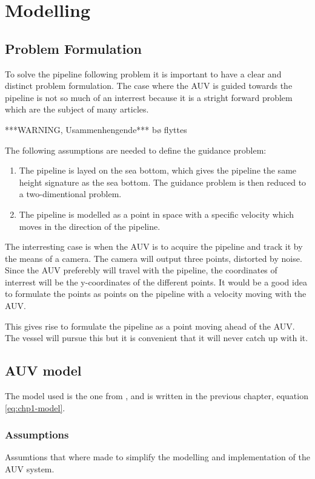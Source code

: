\chapter{Modelling}

\section{Problem Formulation}
\label{chap2:problem}
	To solve the pipeline following problem it is important to have a clear and distinct problem formulation. 
	The case where the AUV is guided towards the pipeline is not so much of an interrest because it is a stright 
	forward problem which are the subject of many articles. 


	***WARNING, Usammenhengende*** bø flyttes

	The following assumptions are needed to define the guidance problem:
		\begin{enumerate}
			\item The pipeline is layed on the sea bottom, which gives the pipeline the same
			height signature as the sea bottom. The guidance problem is then reduced to a
			two-dimentional problem.
			\item The pipeline is modelled as a point in space with a specific velocity which
			moves in the direction of the pipeline.
		\end{enumerate}

	The interresting case is when the AUV is to acquire the pipeline and track it by the means of a camera. The
	camera will output three points, distorted by noise. Since the AUV preferebly will travel with the
	pipeline, the coordinates of interrest will be the y-coordinates of the different points. It would be
	a good idea to formulate the points as points on the pipeline with a velocity moving with the AUV.

	This gives rise to formulate the pipeline as a point moving ahead of the AUV. The vessel will pursue
	this but it is convenient that it will never catch up with it.


\section{AUV model}
	The model used is the one from \cite{fossen}, and is written in the previous chapter, equation \eqref{eq:chp1-model}.
	
	\subsection{Assumptions}
	Assumtions that where made to simplify the modelling and implementation of the AUV system.
